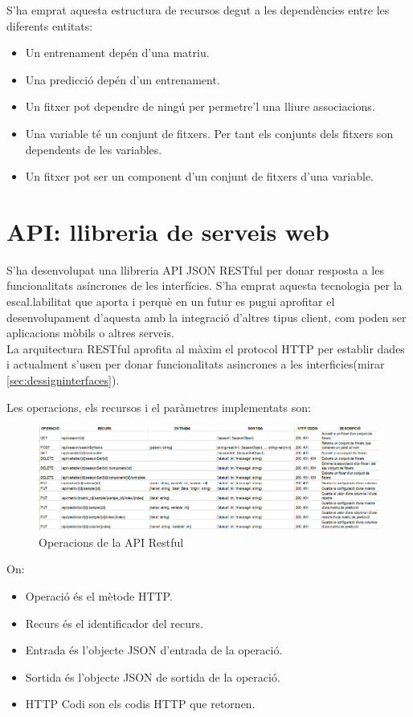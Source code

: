 S'ha emprat aquesta estructura de recursos degut a les dependències entre les diferents entitats:
\begin{itemize}
\item Un entrenament dep\'{e}n d'una matriu.
\item Una predicci\'{o} dep\'{e}n d'un entrenament.
\item Un fitxer pot dependre de ningú per permetre'l una lliure associacions.
\item Una variable t\'{e} un conjunt de fitxers. Per tant els conjunts dels fitxers son dependents de les variables.
\item Un fitxer pot ser un component d'un conjunt de fitxers d'una variable.
\end{itemize}

\section{API: llibreria de serveis web}
S'ha desenvolupat una llibreria API JSON RESTful per donar resposta a les funcionalitats asíncrones de les interfícies.\cite{apijson} S'ha emprat aquesta tecnologia per la escal.labilitat que aporta i perquè en un futur es pugui aprofitar el desenvolupament d'aquesta amb la integració d'altres tipus client, com poden ser aplicacions mòbils o altres serveis.\\

La arquitectura RESTful aprofita al màxim el protocol HTTP per establir dades i actualment s'usen per donar funcionalitats asincrones a les interficies(mirar \ref{sec:dessigninterfaces}).

Les operacions, els recursos i el paràmetres implementats son:\\
\begin{figure}[H]
  \includegraphics[scale=0.5]{img/implementation/apirestul.png}
  \caption{Operacions de la API Restful}
  \label{fig:apirestful}
\end{figure}
On:
\begin{itemize}
\item Operació \'{e}s el mètode HTTP.
\item Recurs \'{e}s el identificador del recurs.
\item Entrada \'{e}s l'objecte JSON d'entrada de la operació.
\item Sortida \'{e}s l'objecte JSON de sortida de la operació.
\item HTTP Codi son els codis HTTP que retornen.\cite{listhttpcodis}
\end{itemize}

